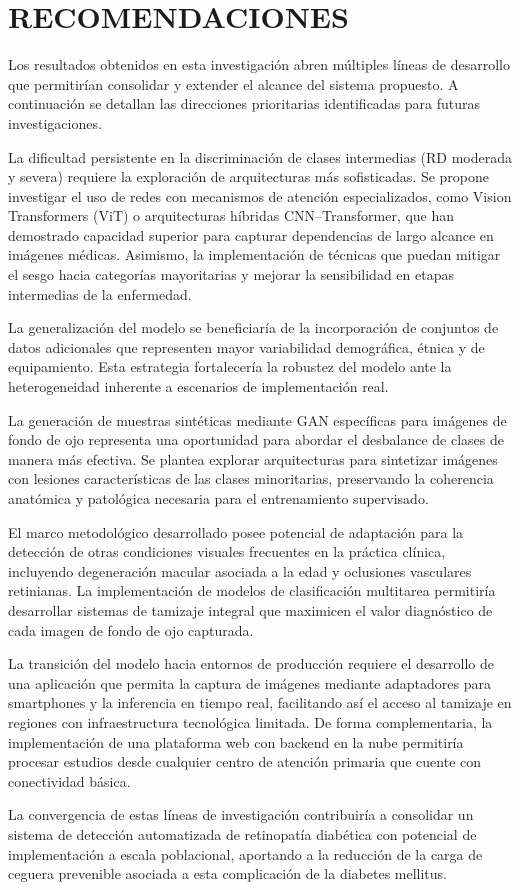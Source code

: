 
\chapter{RECOMENDACIONES}

Los resultados obtenidos en esta investigación abren múltiples líneas de desarrollo
que permitirían consolidar y extender el alcance del sistema propuesto. A continuación
se detallan las direcciones prioritarias identificadas para futuras investigaciones.

La dificultad persistente en la discriminación de clases intermedias (RD moderada y
severa) requiere la exploración de arquitecturas más sofisticadas. Se propone investigar
el uso de redes con mecanismos de atención especializados, como Vision Transformers
(ViT) o arquitecturas híbridas CNN--Transformer, que han demostrado capacidad superior
para capturar dependencias de largo alcance en imágenes médicas. Asimismo, la
implementación de técnicas que puedan mitigar el sesgo hacia categorías mayoritarias y
mejorar la sensibilidad en etapas intermedias de la enfermedad.

La generalización del modelo se beneficiaría de la incorporación de conjuntos de datos
adicionales que representen mayor variabilidad demográfica, étnica y de equipamiento.
Esta estrategia fortalecería la robustez del modelo ante la heterogeneidad inherente a
escenarios de implementación real.

La generación de muestras sintéticas mediante GAN
específicas para imágenes de fondo de ojo representa una oportunidad para abordar el
desbalance de clases de manera más efectiva. Se plantea explorar arquitecturas para
sintetizar imágenes con lesiones características de las clases minoritarias, preservando
la coherencia anatómica y patológica necesaria para el entrenamiento supervisado.

El marco metodológico desarrollado posee potencial de adaptación para la detección de
otras condiciones visuales frecuentes en la práctica clínica, incluyendo
degeneración macular asociada a la edad y oclusiones vasculares retinianas. La
implementación de modelos de clasificación multitarea permitiría desarrollar sistemas de
tamizaje integral que maximicen el valor diagnóstico de cada imagen de fondo de ojo
capturada.

La transición del modelo hacia entornos de producción requiere el desarrollo de una
aplicación que permita la captura de imágenes mediante adaptadores para smartphones y
la inferencia en tiempo real, facilitando así el acceso al tamizaje en regiones con
infraestructura tecnológica limitada. De forma complementaria, la implementación de una
plataforma web con backend en la nube permitiría procesar estudios desde cualquier
centro de atención primaria que cuente con conectividad básica.

La convergencia de estas líneas de investigación contribuiría a consolidar un sistema de
detección automatizada de retinopatía diabética con potencial de implementación a escala
poblacional, aportando a la reducción de la carga de ceguera prevenible asociada a esta
complicación de la diabetes mellitus.
